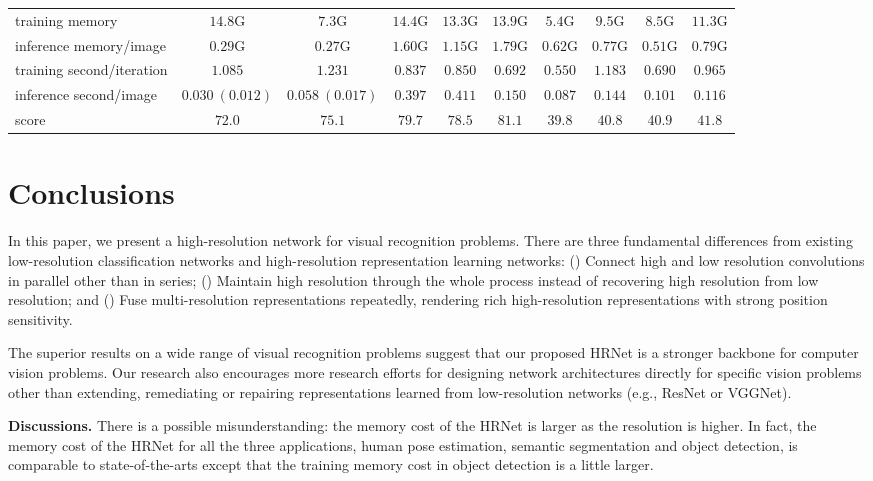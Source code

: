 \documentclass[10pt,journal,compsoc]{IEEEtran}
\begin{document}
\begin{table}[t]
\begin{tabular}{l|cc|ccc|cccc}
        \hline
        training memory & $14.8$G & $7.3$G & $14.4$G & $13.3$G & $13.9$G& $5.4$G & $9.5$G & $8.5$G & $11.3$G\\
        inference memory/image & $0.29$G & $0.27$G & $1.60$G& $1.15$G & $1.79$G & $0.62$G & $0.77$G & $0.51$G & $0.79$G \\
        \hline
        training second/iteration & $1.085$ & $1.231$ & $0.837$ & $0.850$ & $0.692$ & $0.550$ & $1.183$ & $0.690$ & $0.965$ \\
        inference second/image  & $0.030~(0.012)$ & $0.058~(0.017)$ & $0.397$ & $0.411$ & $0.150$ & $0.087$ & $0.144$ & $0.101$ & $0.116$ \\
        \hline
        score & $72.0$ & $75.1$ & $79.7$ & $78.5$ & $81.1$ & $39.8$ & $40.8$ & $40.9$ & $41.8$ \\ 
        \hline
    \end{tabular} 
\end{table}

\section{Conclusions}
In this paper,
we present a high-resolution network 
for visual recognition problems.
There are three fundamental differences from
existing low-resolution classification networks 
and high-resolution representation learning networks:
() Connect high and low resolution convolutions
in parallel other than in series;
() Maintain high resolution through the whole process instead of recovering high resolution
from low resolution;
and () Fuse multi-resolution representations repeatedly,
rendering rich high-resolution representations
with strong position sensitivity.

The superior results on a wide range of visual recognition problems
suggest that our proposed HRNet is a stronger backbone for computer vision problems.
Our research also encourages more research efforts
for designing network architectures directly for specific vision problems 
other than extending, remediating or repairing
representations learned from low-resolution networks (e.g., ResNet or VGGNet).

\vspace{1mm}
\noindent\textbf{Discussions.}
{There is a possible misunderstanding:
the memory cost of the HRNet is larger
as the resolution is higher.
In fact,
the memory cost of the HRNet for all the three applications, human pose estimation,
semantic segmentation and object detection,
is comparable to state-of-the-arts
except that the training memory cost in object detection is a little larger.}
\end{document}
